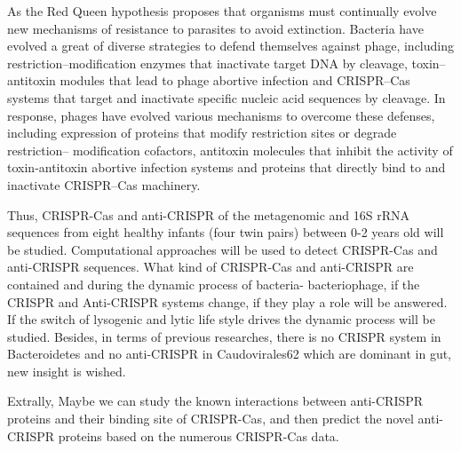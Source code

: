\documentclass[a4paper][11pt][titlepage]{article}
\begin{document}
     As the Red Queen hypothesis proposes that organisms must continually evolve new 
     mechanisms of resistance to parasites to avoid extinction.\cite{liow2011red} Bacteria have evolved 
     a great of diverse strategies to defend themselves against phage, including 
     restriction–modification enzymes that inactivate target DNA by cleavage, toxin–antitoxin 
     modules that lead to phage abortive infection and CRISPR–Cas systems that target and 
     inactivate specific nucleic acid sequences by cleavage. In response, phages have evolved 
     various mechanisms to overcome these defenses, including expression of proteins that 
     modify restriction sites\cite{kruger1983bacteriophage} or degrade restriction– modification cofactors\cite{studier1976samase}, antitoxin 
     molecules that inhibit the activity of toxin‑antitoxin abortive infection systems\cite{otsuka2012dmd} and 
     proteins that directly bind to and inactivate CRISPR–Cas machinery\cite{pawluk2016naturally}.

     Thus, CRISPR-Cas and anti-CRISPR of the metagenomic and 16S rRNA sequences from eight 
     healthy infants (four twin pairs) between 0-2 years old \cite{lim2015early} will be studied. Computational 
     approaches will be used to detect CRISPR-Cas and anti-CRISPR sequences. What kind of 
     CRISPR-Cas and anti-CRISPR are contained and during the dynamic process of bacteria-
     bacteriophage, if the CRISPR and Anti-CRISPR systems change, if they play a role will 
     be answered. If the switch of lysogenic and lytic life style drives the dynamic process 
     will be studied. Besides, in terms of previous researches, there is no CRISPR system in 
     Bacteroidetes and no anti-CRISPR in Caudovirales62 which are dominant in gut, new insight 
     is wished. 

     Extrally, Maybe we can study the known interactions between anti-CRISPR proteins 
     and their binding site of CRISPR-Cas, and then predict the novel anti-CRISPR proteins 
     based on the numerous CRISPR-Cas data.\cite{alipanahi2015predicting}
  
\end{document}
